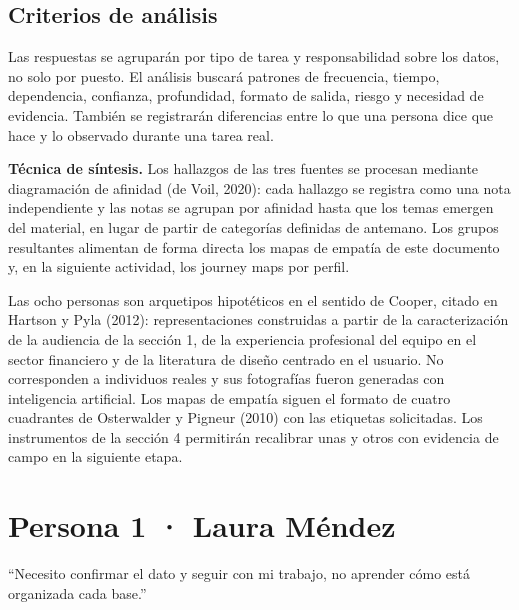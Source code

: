 \subsection{Criterios de análisis}

Las respuestas se agruparán por tipo de tarea y responsabilidad sobre los datos, no solo por
puesto. El análisis buscará patrones de frecuencia, tiempo, dependencia, confianza,
profundidad, formato de salida, riesgo y necesidad de evidencia. También se registrarán
diferencias entre lo que una persona dice que hace y lo observado durante una tarea real.

\textbf{\textcolor{uxnavy}{Técnica de síntesis.}} Los hallazgos de las tres fuentes se
procesan mediante diagramación de afinidad (de Voil, 2020): cada hallazgo se registra como una
nota independiente y las notas se agrupan por afinidad hasta que los temas emergen del
material, en lugar de partir de categorías definidas de antemano. Los grupos resultantes
alimentan de forma directa los mapas de empatía de este documento y, en la siguiente
actividad, los journey maps por perfil.

\clearpage
{}

\begin{uxnota}
Las ocho personas son arquetipos hipotéticos en el sentido de Cooper, citado en Hartson y
Pyla (2012): representaciones construidas a partir de la caracterización de la audiencia de la
sección 1, de la experiencia profesional del equipo en el sector financiero y de la literatura
de diseño centrado en el usuario. No corresponden a individuos reales y sus fotografías fueron
generadas con inteligencia artificial. Los mapas de empatía siguen el formato de cuatro
cuadrantes de Osterwalder y Pigneur (2010) con las etiquetas solicitadas. Los instrumentos de
la sección 4 permitirán recalibrar unas y otros con evidencia de campo en la siguiente etapa.
\end{uxnota}

\section{Persona 1 · Laura Méndez}

  {“Necesito confirmar el dato y seguir con mi trabajo, no aprender cómo está organizada cada
   base.”}

